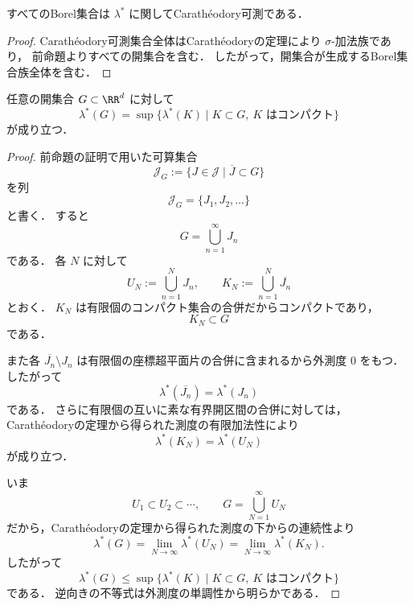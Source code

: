 \begin{corollary}[Borel集合]
すべてのBorel集合は $\lambda^*$ に関してCarathéodory可測である．
\end{corollary}
\begin{proof}
Carathéodory可測集合全体はCarathéodoryの定理により $\sigma$-加法族であり，
前命題よりすべての開集合を含む．
したがって，開集合が生成するBorel集合族全体を含む．
\end{proof}

\begin{proposition}[開集合の内正則性]
任意の開集合 $G \subset \RR^d$ に対して
\[
\lambda^*(G)
=
\sup\{\lambda^*(K)\mid K \subset G,\ K \text{ はコンパクト}\}
\]
が成り立つ．
\end{proposition}
\begin{proof}
前命題の証明で用いた可算集合
\[
\mathcal J_G:=\{J \in \mathcal J\mid \overline J\subset G\}
\]
を列
\[
\mathcal J_G=\{J_1,J_2,\dots\}
\]
と書く．
すると
\[
G=\bigcup_{n=1}^{\infty}J_n
\]
である．
各 $N$ に対して
\[
U_N:=\bigcup_{n=1}^{N}J_n,\qquad
K_N:=\bigcup_{n=1}^{N}\overline{J_n}
\]
とおく．
$K_N$ は有限個のコンパクト集合の合併だからコンパクトであり，
\[
K_N\subset G
\]
である．

また各 $\overline{J_n}\setminus J_n$ は有限個の座標超平面片の合併に含まれるから外測度 $0$ をもつ．
したがって
\[
\lambda^*(\overline{J_n})=\lambda^*(J_n)
\]
である．
さらに有限個の互いに素な有界開区間の合併に対しては，
Carathéodoryの定理から得られた測度の有限加法性により
\[
\lambda^*(K_N)=\lambda^*(U_N)
\]
が成り立つ．

いま
\[
U_1\subset U_2\subset \cdots,\qquad
G=\bigcup_{N=1}^{\infty}U_N
\]
だから，Carathéodoryの定理から得られた測度の下からの連続性より
\[
\lambda^*(G)=\lim_{N\to\infty}\lambda^*(U_N)=\lim_{N\to\infty}\lambda^*(K_N).
\]
したがって
\[
\lambda^*(G)\le \sup\{\lambda^*(K)\mid K\subset G,\ K\text{ はコンパクト}\}
\]
である．
逆向きの不等式は外測度の単調性から明らかである．
\end{proof}

